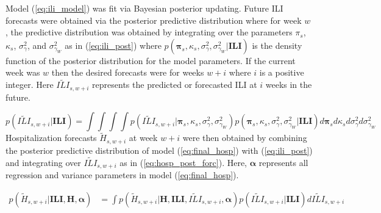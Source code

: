 Model (\ref{eq:ili_model}) was fit via Bayesian posterior updating. Future ILI 
forecasts were obtained via the posterior predictive distribution where for
week $w$, the predictive distribution was obtained by integrating over the 
parameters $\pi_s$, $\kappa_s$, $\sigma^2_{\gamma}$, and $\sigma^2_{\gamma_W}$ 
as in (\ref{eq:ili_post}) where 
$p(\boldsymbol{\pi}_s, \kappa_s, \sigma^2_{\gamma}, \sigma^2_{\gamma_W} | \textbf{ILI})$ 
is the density function of the posterior distribution for the model parameters. 
If the current week was $w$ then the desired forecasts were for weeks $w + i$ 
where $i$ is a positive integer. Here $\widetilde{ILI}_{s,w + i}$ represents the 
predicted or forecasted ILI at $i$ weeks in the future.

\begin{equation}
    \label{eq:ili_post}
    p(\widetilde{ILI}_{s,w +i} | \textbf{ILI}) = \int \int \int \int 
    p(\widetilde{ILI}_{s,w + i} | \boldsymbol{\pi}_s, \kappa_s, 
    \sigma^2_{\gamma}, \sigma^2_{\gamma_W}) p(\boldsymbol{\pi}_s, \kappa_s, 
    \sigma^2_{\gamma}, \sigma^2_{\gamma_W} | \textbf{ILI}) 
    d\boldsymbol{\pi}_s d \kappa_s d \sigma^2_{\gamma} d \sigma^2_{\gamma_W}
\end{equation}
Hospitalization forecasts $\widetilde{H}_{s,w + i}$ at week $w + i$ were then
obtained by combining the posterior predictive distribution of model 
(\ref{eq:final_hosp}) with (\ref{eq:ili_post}) and integrating over 
$\widetilde{ILI}_{s,w + i}$ as in (\ref{eq:hosp_post_forc}). Here,
$\boldsymbol{\alpha}$ represents all regression and variance parameters in
model (\ref{eq:final_hosp}).

\begin{equation}
\begin{aligned}
\label{eq:hosp_post_forc}
    p(\tilde{H}_{s,w + i} | \textbf{ILI}, \textbf{H}, \boldsymbol{\alpha}) &= 
       \int p(\tilde{H}_{s,w + i} | \textbf{H}, \textbf{ILI}, 
       \widetilde{ILI}_{s,w + i}, \boldsymbol{\alpha}) 
       p(\widetilde{ILI}_{s,w + i} | \textbf{ILI}) d\widetilde{ILI}_{s,w + i}
\end{aligned}
\end{equation}





 
   











